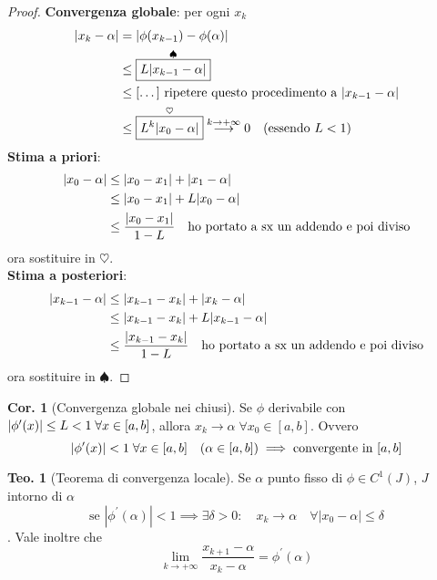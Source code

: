\documentclass[a4paper,10pt]{article}
\theoremstyle{definition}
\theoremstyle{indentdefinition}
\theoremstyle{indenttheorem}
\newtheorem{thm}{Teo.}
\newtheorem{cor}{Cor.}
\theoremstyle{myremark}
\theoremstyle{indentgeneral}
\theoremstyle{plain}
\theoremstyle{plain}
\newenvironment{myboxed} 
{\noindent\begin{lrbox}{\mybox}\begin{minipage}{\textwidth}}
{\end{minipage}\end{lrbox}\fbox{\usebox{\mybox}}}
\begin{document}
\begin{proof} \textbf{Convergenza globale}: per ogni $x_k$
\begin{align*}
    \abs{x_k-\alpha}&=\abs{\phi(x_{k-1})-\phi(\alpha)} \\
    &\le \overset{\spadesuit}{\boxed{L\abs{x_{k-1}-\alpha}}}\\
    &\le [\dots] \text{ ripetere questo procedimento a }\abs{x_{k-1}-\alpha} \\
    &\le \overset{\heartsuit}{\boxed{L^k\abs{x_0-\alpha}}} \overset{k\to+\infty}{\longrightarrow}0 \quad \text{(essendo $L<1$)}
\end{align*}
\textbf{Stima a priori}: 
\begin{align*}
    \abs{x_0-\alpha}&\le\abs{x_0-x_1}+\abs{x_1-\alpha}\\
    &\le \abs{x_0-x_1}+L\abs{x_0-\alpha} \\
    &\le \frac{\abs{x_0-x_1}}{1-L} \quad \text{ho portato a sx un addendo e poi diviso}
\end{align*}
ora sostituire in $\heartsuit$.\\
\textbf{Stima a posteriori}:
\begin{align*}
 \abs{x_{k-1}-\alpha}&\le\abs{x_{k-1}-x_k}+\abs{x_k-\alpha}\\
    &\le \abs{x_{k-1}-x_k}+L\abs{x_{k-1}-\alpha} \\
    &\le \frac{\abs{x_{k-1}-x_k}}{1-L} \quad \text{ho portato a sx un addendo e poi diviso}
\end{align*}
ora sostituire in $\spadesuit$.
\end{proof}

\begin{myboxed}
\begin{cor}[Convergenza globale nei chiusi]
    Se $\phi$ derivabile con $\abs{\phi'(x)}\le L<1\;\forall x\in[a,b]$, allora $x_k\longrightarrow\alpha\;\forall x_0\in[a,b]$. Ovvero
    $$\abs{\phi'(x)}<1\;\forall x\in[a,b]\quad (\alpha\in[a,b])\implies \text{convergente in }[a,b]$$
\end{cor}
\end{myboxed}

\begin{myboxed}
\begin{thm}[Teorema di convergenza locale]
Se $\alpha$ punto fisso di $\phi\in C^{1}\left(J\right)$, $J$
intorno di $\alpha$
$$\text{se } \left|\phi^{\prime}\left(\alpha\right)\right|<1\implies
\exists\delta>0:\quad
 x_{k}\longrightarrow\alpha\quad \forall\left|x_{0}-\alpha\right|\leq\delta$$ . Vale inoltre che
$$\lim_{k\rightarrow+\infty}\frac{x_{k+1}-\alpha}{x_{k}-\alpha}=\phi^{\prime}\left(\alpha\right)$$
\end{thm}
\end{myboxed}
\end{document}
